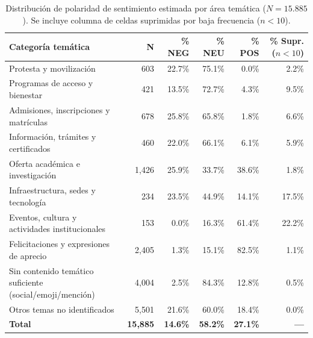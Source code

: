 \begin{table}[htbp]
\centering
\small
\caption{Distribución de polaridad de sentimiento estimada por área temática ($N = 15.885$). Se incluye columna de celdas suprimidas por baja frecuencia ($n < 10$).}
\label{tab:tema_sentimiento_actualizado}
\begin{tabular}{lrrrrr}
\toprule
\textbf{Categoría temática} & \textbf{N} & \textbf{\% NEG} & \textbf{\% NEU} & \textbf{\% POS} & \textbf{\% Supr. ($n<10$)} \\
\midrule
Protesta y movilización & 603 & 22.7\% & 75.1\% & 0.0\% & 2.2\% \\
Programas de acceso y bienestar & 421 & 13.5\% & 72.7\% & 4.3\% & 9.5\% \\
Admisiones, inscripciones y matrículas & 678 & 25.8\% & 65.8\% & 1.8\% & 6.6\% \\
Información, trámites y certificados & 460 & 22.0\% & 66.1\% & 6.1\% & 5.9\% \\
Oferta académica e investigación & 1,426 & 25.9\% & 33.7\% & 38.6\% & 1.8\% \\
Infraestructura, sedes y tecnología & 234 & 23.5\% & 44.9\% & 14.1\% & 17.5\% \\
Eventos, cultura y actividades institucionales & 153 & 0.0\% & 16.3\% & 61.4\% & 22.2\% \\
Felicitaciones y expresiones de aprecio & 2,405 & 1.3\% & 15.1\% & 82.5\% & 1.1\% \\
\midrule
Sin contenido temático suficiente (social/emoji/mención) & 4,004 & 2.5\% & 84.3\% & 12.8\% & 0.5\% \\
Otros temas no identificados & 5,501 & 21.6\% & 60.0\% & 18.4\% & 0.0\% \\
\midrule
\textbf{Total} & \textbf{15,885} & \textbf{14.6\%} & \textbf{58.2\%} & \textbf{27.1\%} & \textbf{—} \\
\bottomrule
\end{tabular}
\end{table}

